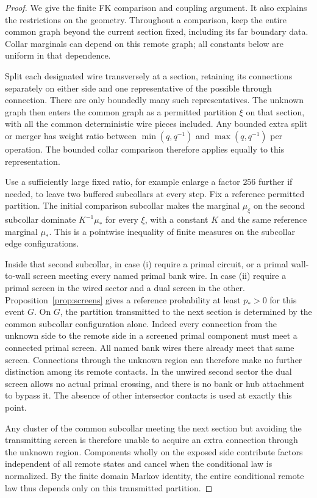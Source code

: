 \begin{proof}
We give the finite FK comparison and coupling argument. It also explains
the restrictions on the geometry. Throughout a comparison, keep the
entire common graph beyond the current section fixed, including its
far boundary data. Collar marginals can depend on this remote graph;
all constants below are uniform in that dependence.

Split each designated wire transversely
at a section, retaining its connections separately on either side
and one representative of the possible through connection. There
are only boundedly many such representatives. The unknown graph
then enters the common graph as a permitted partition $\xi$ on that
section, with all the common deterministic wire pieces included.
Any bounded extra split or merger has weight ratio between
$\min(q,q^{-1})$ and $\max(q,q^{-1})$ per operation. The bounded
collar comparison therefore applies equally to this representation.

Use a sufficiently large fixed ratio, for example enlarge a factor
$256$ further if needed, to leave two buffered subcollars at every
step. Fix a reference permitted partition. The initial comparison
subcollar makes the marginal $\mu_\xi$ on the second subcollar
dominate $K^{-1}\mu_*$ for every $\xi$, with a constant $K$ and
the same reference marginal $\mu_*$. This is a pointwise inequality
of finite measures on the subcollar edge configurations.

Inside that second subcollar, in case (i) require a primal circuit,
or a primal wall-to-wall screen meeting every named primal bank wire.
In case (ii) require a primal screen in the wired sector and a dual
screen in the other. Proposition~\ref{prop:screens} gives a reference
probability at least $p_*>0$ for this event $G$. On $G$, the partition
transmitted to the next section is determined by the common
subcollar configuration alone. Indeed every connection from the
unknown side to the remote side in a screened primal component must
meet a connected primal screen. All named bank wires there
already meet that same screen. Connections through the unknown
region can therefore make no further distinction among its remote
contacts. In the unwired second sector the dual screen allows no
actual primal crossing, and there is no bank or hub attachment to bypass it.
The absence of other intersector contacts is used at exactly this
point.

Any cluster of the common subcollar meeting the next section but
avoiding the transmitting screen is therefore unable to acquire
an extra connection through the unknown region. Components wholly
on the exposed side contribute factors independent of all remote
states and cancel when the conditional law is normalized. By the
finite domain Markov identity, the entire conditional remote law
thus depends only on this transmitted partition.


\end{proof}
